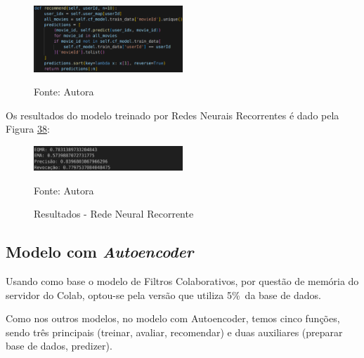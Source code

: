 \begin{itemize}
\begin{figure}[htbp]
        \vspace{2pt} %
        
        \includegraphics[width=0.5\textwidth]{figuras/recom-rnn.eps}
        
        \vspace{2pt} %
        
        \small Fonte: Autora
    \end{figure}

\end{itemize}

Os resultados do modelo treinado por Redes Neurais Recorrentes é dado pela Figura \hyperref[fig:rnn-5]{38}:
\begin{figure}[htbp]
    \centering
    \caption{Resultados - Rede Neural Recorrente}
    \label{fig:rnn-5}
    
    \vspace{2pt} %
    
    \includegraphics[width=0.5\textwidth]{figuras/rnn-5.eps}
    
    \vspace{2pt} %
    
    \small Fonte: Autora
\end{figure}

\subsection{Modelo com \textit{Autoencoder}}\label{subsec:autoencoder}

Usando como base o modelo de Filtros Colaborativos, por questão de memória do servidor do Colab, optou-se pela
versão que utiliza 5\%\ da base de dados.

Como nos outros modelos, no modelo com Autoencoder, temos cinco funções, 
sendo três principais (treinar, avaliar, recomendar) e duas auxiliares (preparar base de dados, predizer).

